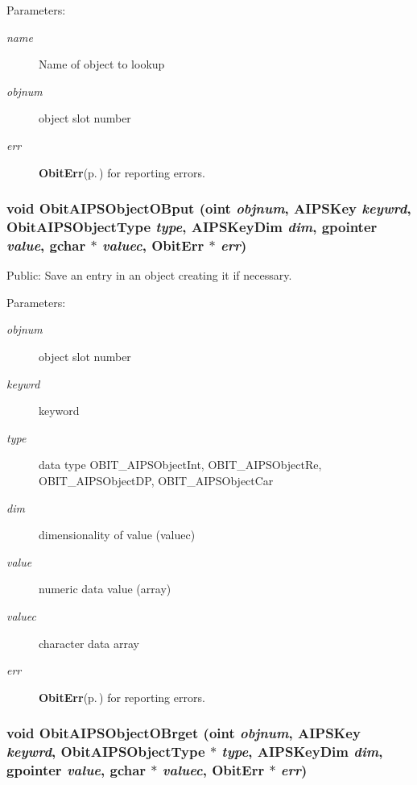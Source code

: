 \begin{Desc}
\item[Parameters:]
\begin{description}
\item[{\em name}]Name of object to lookup \item[{\em objnum}]object slot number \item[{\em err}]{\bf Obit\-Err}{\rm (p.\,\pageref{structObitErr})} for reporting errors. \end{description}
\end{Desc}
\subsubsection{\setlength{\rightskip}{0pt plus 5cm}void Obit\-AIPSObject\-OBput ({\bf oint} {\em objnum}, {\bf AIPSKey} {\em keywrd}, Obit\-AIPSObject\-Type {\em type}, {\bf AIPSKey\-Dim} {\em dim}, gpointer {\em value}, gchar $\ast$ {\em valuec}, {\bf Obit\-Err} $\ast$ {\em err})}\label{ObitAIPSObject_8c_a31}


Public: Save an entry in an object creating it if necessary. 

\begin{Desc}
\item[Parameters:]
\begin{description}
\item[{\em objnum}]object slot number \item[{\em keywrd}]keyword \item[{\em type}]data type OBIT\_\-AIPSObject\-Int, OBIT\_\-AIPSObject\-Re, OBIT\_\-AIPSObject\-DP, OBIT\_\-AIPSObject\-Car \item[{\em dim}]dimensionality of value (valuec) \item[{\em value}]numeric data value (array) \item[{\em valuec}]character data array \item[{\em err}]{\bf Obit\-Err}{\rm (p.\,\pageref{structObitErr})} for reporting errors. \end{description}
\end{Desc}
\subsubsection{\setlength{\rightskip}{0pt plus 5cm}void Obit\-AIPSObject\-OBrget ({\bf oint} {\em objnum}, {\bf AIPSKey} {\em keywrd}, Obit\-AIPSObject\-Type $\ast$ {\em type}, {\bf AIPSKey\-Dim} {\em dim}, gpointer {\em value}, gchar $\ast$ {\em valuec}, {\bf Obit\-Err} $\ast$ {\em err})}\label{ObitAIPSObject_8c_a26}


